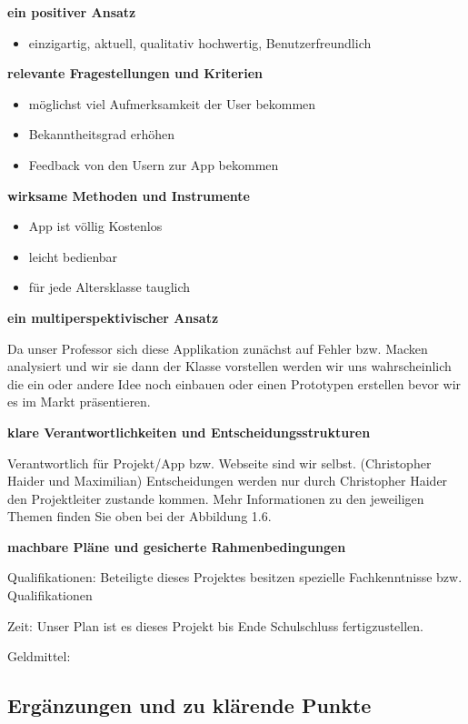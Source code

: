 \textbf {ein positiver Ansatz}

\begin{itemize}
	\item einzigartig, aktuell, qualitativ hochwertig, Benutzerfreundlich
\end{itemize}




\textbf {relevante Fragestellungen und Kriterien}

\begin{itemize}
	\item möglichst viel Aufmerksamkeit der User bekommen
	\item Bekanntheitsgrad erhöhen
	\item Feedback von den Usern zur App bekommen
\end{itemize}




\textbf {wirksame Methoden und Instrumente}

\begin{itemize}
	\item App ist völlig Kostenlos
	\item leicht bedienbar
	\item für jede Altersklasse tauglich
\end{itemize}


\textbf {ein multiperspektivischer Ansatz}

Da unser Professor sich diese Applikation zunächst auf Fehler bzw. Macken analysiert und wir sie dann der Klasse vorstellen werden  wir uns wahrscheinlich die ein oder andere Idee noch einbauen oder einen Prototypen erstellen bevor wir es im Markt präsentieren.

\textbf {klare Verantwortlichkeiten und Entscheidungsstrukturen}


Verantwortlich für Projekt/App bzw. Webseite sind wir selbst. (Christopher Haider und Maximilian)
Entscheidungen werden nur durch Christopher Haider den Projektleiter zustande kommen.
Mehr Informationen zu den jeweiligen Themen finden Sie oben bei der Abbildung 1.6.


\textbf {machbare Pläne und gesicherte Rahmenbedingungen}

Qualifikationen: Beteiligte dieses Projektes besitzen spezielle Fachkenntnisse bzw. Qualifikationen

Zeit: Unser Plan ist es dieses Projekt bis Ende Schulschluss fertigzustellen.

Geldmittel: 


\subsection{Ergänzungen und zu klärende Punkte}

